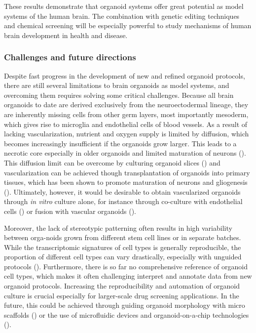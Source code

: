 These results demonstrate that organoid systems offer great potential as model systems of the human brain. The combination with genetic editing techniques and chemical screening will be especially powerful to study mechanisms of human brain development in health and disease.


\subsubsection{Challenges and future directions}

Despite fast progress in the development of new and refined organoid protocols, there are still several limitations to brain organoids as model systems, and overcoming them requires solving some critical challenges. Because all brain organoids to date are derived exclusively from the neuroectodermal lineage, they are inherently missing cells from other germ layers, most importantly mesoderm, which gives rise to microglia and endothelial cells of blood vessels. As a result of lacking vascularization, nutrient and oxygen supply is limited by diffusion, which becomes increasingly insufficient if the organoids grow larger. This leads to a necrotic core especially in older organoids and limited maturation of neurons (\cite{vertesy_cellular_2022,bhaduri_cell_2020}). This diffusion limit can be overcome by culturing organoid slices (\cite{qian_sliced_2020}) and vascularization can be achieved though transplantation of organoids into primary tissues, which has been shown to promote maturation of neurons and gliogenesis (\cite{mansour_vivo_2018}). Ultimately, however, it would be desirable to obtain vascularized organoids through \textit{in vitro} culture alone, for instance through co-culture with endothelial cells (\cite{takebe_vascularized_2015}) or fusion with vascular organoids (\cite{wimmer_human_2019}). 

Moreover, the lack of stereotypic patterning often results in high variability between orga-noids grown from different stem cell lines or in separate batches. While the transcriptomic signatures of cell types is generally reproducible, the proportion of different cell types can vary drastically, especially with unguided protocols (\cite{kanton_organoid_2019}). Furthermore, there is so far no comprehensive reference of organoid cell types, which makes it often challenging interpret and annotate data from new organoid protocols. Increasing the reproducibility and automation of organoid culture is crucial especially for larger-scale drug screening applications. In the future, this could be achieved through guiding organoid morphology with micro scaffolds (\cite{lancaster_guided_2017}) or the use of microfluidic devices and organoid-on-a-chip technologies (\cite{park_organoids---chip_2019}).





